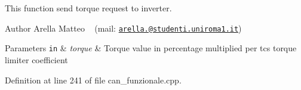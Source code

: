 This function send torque request to inverter.

\begin{DoxyAuthor}{Author}
Arella Matteo ~\newline
 (mail\+: \href{mailto:arella.1646983@studenti.uniroma1.it}{\tt arella.@studenti.\+uniroma1.\+it})
\end{DoxyAuthor}

\begin{DoxyParams}[1]{Parameters}
\mbox{\tt in}  & {\em torque} & Torque value in percentage multiplied per tcs torque limiter coefficient \\
\hline
\end{DoxyParams}


Definition at line 241 of file can\+\_\+funzionale.\+cpp.

